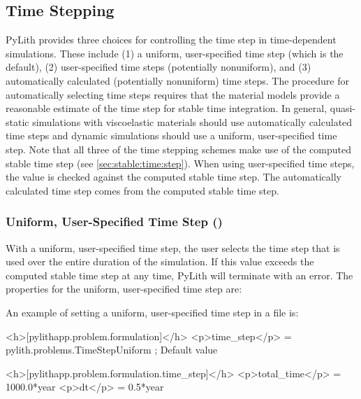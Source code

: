 \subsection{Time Stepping}
\label{sub:Time-Stepping}

PyLith provides three choices for controlling the time step in time-dependent
simulations. These include (1) a uniform, user-specified time step
(which is the default), (2) user-specified time steps (potentially
nonuniform), and (3) automatically calculated (potentially nonuniform)
time steps. The procedure for automatically selecting time steps requires
that the material models provide a reasonable estimate of the time
step for stable time integration. In general, quasi-static simulations
with viscoelastic materials should use automatically calculated time
steps and dynamic simulations should use a uniform, user-specified
time step. Note that all three of the time stepping schemes make use
of the computed stable time step (see \vref{sec:stable:time:step}).
When using user-specified time steps, the value is checked against
the computed stable time step. The automatically calculated time step
comes from the computed stable time step.


\subsubsection{Uniform, User-Specified Time Step ()}

With a uniform, user-specified time step, the user selects the time
step that is used over the entire duration of the simulation. If this
value exceeds the computed stable time step at any time, PyLith will
terminate with an error. The properties for the uniform, user-specified
time step are:
\begin{inventory}
\end{inventory}
An example of setting a uniform, user-specified time step in a 
file is:
\begin{cfg}
<h>[pylithapp.problem.formulation]</h>
<p>time_step</p> = pylith.problems.TimeStepUniform ; Default value

<h>[pylithapp.problem.formulation.time_step]</h>
<p>total_time</p> = 1000.0*year
<p>dt</p> = 0.5*year
\end{cfg}

